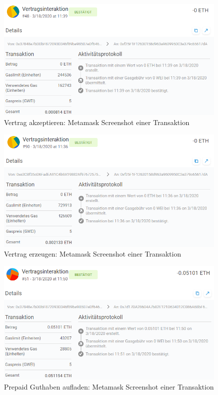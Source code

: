 \begin{figure}[h]
 \centering
 \includegraphics[width=1.0\textwidth]{gfx/screenshots/accept_contract.PNG}
 \caption{Vertrag akzeptieren: Metamask Screenshot einer Transaktion}
 \label{fig:appendix:costs:accept}
\end{figure}

\begin{figure}[h]
 \centering
 \includegraphics[width=1.0\textwidth]{gfx/screenshots/create_contract.PNG}
 \caption{Vertrag erzeugen: Metamask Screenshot einer Transaktion}
 \label{fig:appendix:costs:create}
\end{figure}

\begin{figure}[h]
 \centering
 \includegraphics[width=1.0\textwidth]{gfx/screenshots/charge_contract.PNG}
 \caption{Prepaid Guthaben aufladen: Metamask Screenshot einer Transaktion}
 \label{fig:appendix:costs:charge}
\end{figure}

